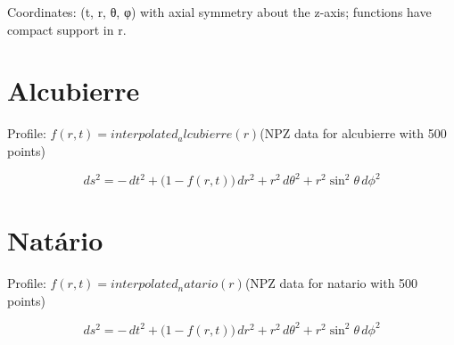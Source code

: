 \documentclass{article}
\begin{document}
Coordinates: (t, r, θ, φ) with axial symmetry about the z-axis; functions have compact support in r.

\section*{Alcubierre}
Profile: $f(r,t) = interpolated_alcubierre(r)$\quad (NPZ data for alcubierre with 500 points)

\[ds^2 = -\,dt^2 + \bigl(1 - f(r,t)\bigr)\,dr^2 + r^2\,d\theta^2 + r^2\sin^2\theta\,d\phi^2\]

\section*{Natário}
Profile: $f(r,t) = interpolated_natario(r)$\quad (NPZ data for natario with 500 points)

\[ds^2 = -\,dt^2 + \bigl(1 - f(r,t)\bigr)\,dr^2 + r^2\,d\theta^2 + r^2\sin^2\theta\,d\phi^2\]
\end{document}
